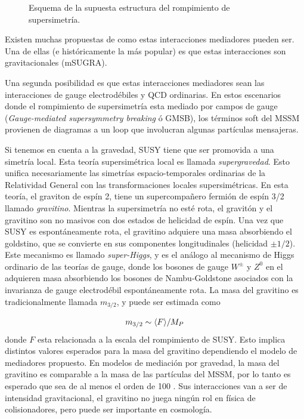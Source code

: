 \begin{figure}[!htbp]
  \centering
  
  \caption{Esquema de la supuesta estructura del rompimiento de supersimetría.}\label{fig:susy_breaking}
\end{figure}

Existen muchas propuestas de como estas interacciones mediadores pueden ser. Una
de ellas (e históricamente la más popular) es que estas interacciones son
gravitacionales (mSUGRA).


Una segunda posibilidad es que estas interacciones mediadores sean las
interacciones de gauge electrodébiles y QCD ordinarias. En estos escenarios
donde el rompimiento de supersimetría esta mediado por campos de gauge
(\emph{Gauge-mediated supersymmetry breaking} ó GMSB), los términos soft del
MSSM provienen de diagramas a un loop que involucran algunas partículas
mensajeras.

Si tenemos en cuenta a la gravedad, SUSY tiene que ser promovida a una simetría
local. Esta teoría supersimétrica local es llamada \emph{supergravedad}. Esto
unifica necesariamente las simetrías espacio-temporales ordinarias de la
Relatividad General con las transformaciones locales supersimétricas. En esta
teoría, el graviton de espín 2, tiene un supercompa\~nero fermión de espín 3/2
llamado \emph{gravitino}. Mientras la supersimetría no esté rota, el gravitón y
el gravitino son no masivos con dos estados de helicidad de espín. Una vez que
SUSY es espontáneamente rota, el gravitino adquiere una masa absorbiendo el
goldstino, que se convierte en sus componentes longitudinales (helicidad $\pm
1/2$). Este mecanismo es llamado \emph{super-Higgs}, y es el análogo al
mecanismo de Higgs ordinario de las teorías de gauge, donde los bosones de gauge
$W^\pm$ y $Z^0$ en el {\SM} adquieren masa absorbiendo los bosones de
Nambu-Goldstone asociados con la invarianza de gauge electrodébil
espontáneamente rota. La masa del gravitino es tradicionalmente llamada
$m_{3/2}$, y puede ser estimada como

\begin{equation}
  m_{3/2} \sim \langle F \rangle / M_P
\end{equation}
%
donde $F$ esta relacionada a la escala del rompimiento de SUSY. Esto implica
distintos valores esperados para la masa del gravitino dependiendo el modelo de
mediadores propuesto. En modelos de mediación por gravedad, la masa del
gravitino es comparable a la masa de las partículas del MSSM, por lo tanto es
esperado que sea de al menos el orden de 100 \gev. Sus interacciones van a ser
de intensidad gravitacional, el gravitino no juega ningún rol en física de
colisionadores, pero puede ser importante en cosmología.

